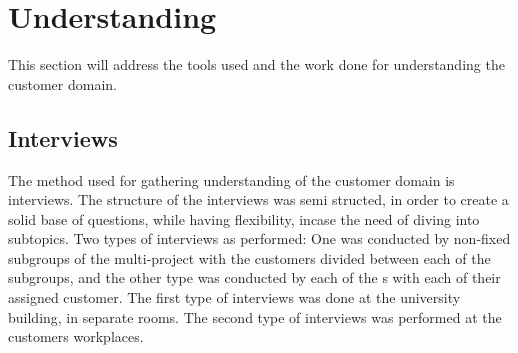 \section{Understanding}
This section will address the tools used and the work done for understanding the customer domain.

\subsection{Interviews}
The method used for gathering understanding of the customer domain is interviews. The structure of the interviews was semi structed, in order to create a solid base of questions, while having flexibility, incase the need of diving into subtopics.
Two types of interviews as performed: One was conducted by non-fixed subgroups of the multi-project with the customers divided between each of the subgroups, and the other type was conducted by each of the \localgroup{}s with each of their assigned customer. The first type of interviews was done at the university building, in separate rooms. The second type of interviews was performed at the customers workplaces.
